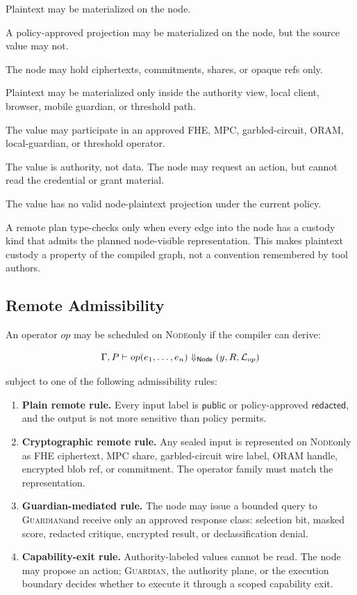\documentclass[11pt]{article}
\newcommand{\roletext}[1]{\textnormal{\textsc{#1}}\xspace}
\newcommand{\node}{\ifmmode\mathsf{Node}\else\roletext{Node}\fi}
\newcommand{\guard}{\ifmmode\mathsf{Guardian}\else\roletext{Guardian}\fi}
\newcommand{\leak}{\mathcal{L}}
\begin{document}
\begin{description}[leftmargin=2.4em]
\item[\(\mathsf{Public}\).] Plaintext may be materialized on the node.
\item[\(\mathsf{Redacted}\).] A policy-approved projection may be materialized
on the node, but the source value may not.
\item[\(\mathsf{Sealed}\).] The node may hold ciphertexts, commitments,
shares, or opaque refs only.
\item[\(\mathsf{GuardianOnly}\).] Plaintext may be materialized only inside the
authority view, local client, browser, mobile guardian, or threshold path.
\item[\(\mathsf{CryptoOperator}\).] The value may participate in an approved
FHE, MPC, garbled-circuit, ORAM, local-guardian, or threshold operator.
\item[\(\mathsf{CapabilityOnly}\).] The value is authority, not data. The node
may request an action, but cannot read the credential or grant material.
\item[\(\mathsf{NeverRemotePlaintext}\).] The value has no valid node-plaintext
projection under the current policy.
\end{description}

A remote plan type-checks only when every edge into the node has a custody kind
that admits the planned node-visible representation. This makes plaintext
custody a property of the compiled graph, not a convention remembered by tool
authors.

\subsection{Remote Admissibility}

An operator \(op\) may be scheduled on \node only if the compiler can derive:

\[
\Gamma, P \vdash op(e_1,\ldots,e_n)
\Downarrow_{\node}
(y, R, \leak_{op})
\]

\noindent subject to one of the following admissibility rules:

\begin{enumerate}[leftmargin=1.5em]
\item \textbf{Plain remote rule.} Every input label is
\(\mathsf{public}\) or policy-approved \(\mathsf{redacted}\), and the output is
not more sensitive than policy permits.
\item \textbf{Cryptographic remote rule.} Any sealed input is represented on
\node only as FHE ciphertext, MPC share, garbled-circuit wire label, ORAM
handle, encrypted blob ref, or commitment. The operator family must match the
representation.
\item \textbf{Guardian-mediated rule.} The node may issue a bounded query to
\guard and receive only an approved response class: selection bit, masked
score, redacted critique, encrypted result, or declassification denial.
\item \textbf{Capability-exit rule.} Authority-labeled values cannot be read.
The node may propose an action; \guard, the authority plane, or the execution
boundary decides whether to execute it through a scoped capability exit.
\end{enumerate}
\end{document}
